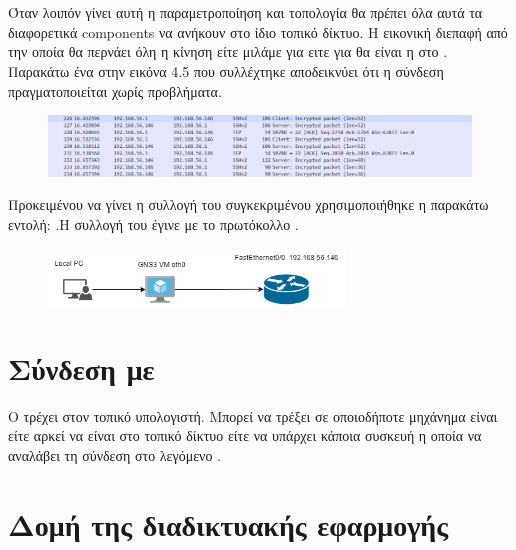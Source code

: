 \section{ }


Όταν λοιπόν γίνει αυτή η παραμετροποίηση και τοπολογία θα πρέπει όλα αυτά τα διαφορετικά components να ανήκουν στο ίδιο τοπικό δίκτυο.
Η εικονική διεπαφή από την οποία θα περνάει όλη η κίνηση είτε μιλάμε για  ειτε για  θα είναι η  στο . Παρακάτω ένα 
 στην εικόνα 4.5 που συλλέχτηκε αποδεικνύει ότι η σύνδεση πραγματοποιείται χωρίς προβλήματα.

\begin{figure}[htb]
	\centering
	\includegraphics[width=1.0\textwidth]{graphics/ssh_connection.png}
	\caption{ }
\end{figure}


Προκειμένου να γίνει η συλλογή του συγκεκριμένου  χρησιμοποιήθηκε η παρακάτω εντολή:
.Η συλλογή του  έγινε με το πρωτόκολλο .


\begin{figure}[h]
	\centering
	\includegraphics[width=0.7\textwidth]{graphics/jason1.png}
	\caption{ }
\end{figure}

\FloatBarrier

\section{Σύνδεση με  }

Ο  τρέχει στον τοπικό υπολογιστή. Μπορεί να τρέξει σε οποιοδήποτε
μηχάνημα είναι  είτε  αρκεί να είναι στο τοπικό δίκτυο
είτε να υπάρχει κάποια συσκευή  η οποία να αναλάβει τη σύνδεση στο λεγόμενο
.

\section{Δομή της διαδικτυακής εφαρμογής  }


